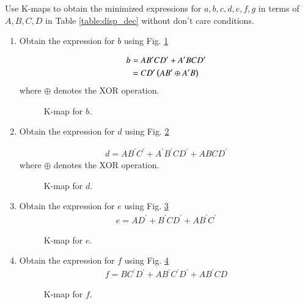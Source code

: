 Use K-maps to obtain the minimized expressions for 
$a,b,c,d,e,f,g$ in terms of $A,B,C,D$ in Table \ref{table:disp_dec} 
without don't care conditions.

\renewcommand{\theequation}{\theenumi}
\renewcommand{\thefigure}{\theenumi}
\begin{enumerate}[label=\thesubsection.\arabic*.,ref=\thesubsection.\theenumi]

\item Obtain the expression for $b$ using Fig. \ref{fig:disp_kmap_b}


\solution

\begin{align}
\label{eq:kmap_disp_b}
b &= A B^{\prime}C D^{\prime} + A^{\prime}B C D^{\prime}
\\
&=C D^{\prime}\left(A B^{\prime} \oplus A^{\prime}B\right)
\end{align}
%
where $\oplus$ denotes the XOR operation.
\begin{figure}[!ht]
\centering
\resizebox{\columnwidth}{!} {

}
\caption{K-map for $b$.}
\label{fig:disp_kmap_b}
\end{figure}
%
\item Obtain the expression for $d$ using Fig. \ref{fig:disp_kmap_d}
\solution


\begin{align}
\label{eq:kmap_disp_d}
d=AB^{\prime}C^{\prime}+A^{\prime}B^{\prime}CD^{\prime}+ABCD^{\prime}
\end{align}
%
where $\oplus$ denotes the XOR operation.
\begin{figure}[!ht]
\centering
\resizebox{\columnwidth}{!} {

}
\caption{K-map for $d$.}
\label{fig:disp_kmap_d}
\end{figure}
\item Obtain the expression for $e$ using Fig. \ref{fig:disp_kmap_e}
%
\begin{align}
\label{eq:kmap_disp_e}
e=AD^{\prime}+B^{\prime}CD^{\prime}+AB^{\prime}C^{\prime}
\end{align}
%
\begin{figure}[!ht]
\centering
\resizebox{\columnwidth}{!} {

}
\caption{K-map for $e$.}
\label{fig:disp_kmap_e}
\end{figure}
%
\item Obtain the expression for $f$ using Fig. \ref{fig:disp_kmap_f}
%
\begin{align}
\label{eq:kmap_disp_f}
f= BC^{\prime}D^{\prime} + AB^{\prime}C^{\prime}D^{\prime} + AB^{\prime}CD
\end{align}
%
\begin{figure}[!ht]
\centering
\resizebox{\columnwidth}{!} {

}
\caption{K-map for $f$.}
\label{fig:disp_kmap_f}
\end{figure}


\end{enumerate}
